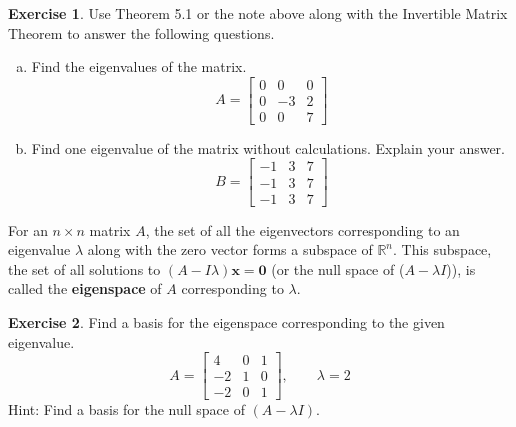\documentclass[10pt]{book}
\newcommand{\boxcolor}{gray!30}
\newenvironment{boxme}{\begin{mdframed}[backgroundcolor=\boxcolor,linewidth=0pt,nobreak=true]}{\end{mdframed}}
\theoremstyle{definition}
\newtheorem{exercise}{Exercise}[section]
\newcommand{\R}{\mathbb{R}}
\newcommand{\vect}[1]{\ensuremath{\boldsymbol{\mathbf{#1}}}}
\begin{document}
\begin{exercise} %
	Use Theorem 5.1 or the note above along with the Invertible Matrix Theorem to answer the following questions.
	\begin{multicols}{2}
		\begin{enumerate}[(a)]
			\item Find the eigenvalues of the matrix.
			$$A=\begin{bmatrix}0&0&0\\0&-3&2\\0&0&7\end{bmatrix}$$
			\columnbreak 
			\item Find one eigenvalue of the matrix without calculations. Explain your answer.
			$$B=\begin{bmatrix}-1&3&7\\-1&3&7\\-1&3&7\end{bmatrix}$$
		\end{enumerate}
	\end{multicols}
\end{exercise}
\vfill


\begin{boxme}
	For an $n\times n$ matrix $A$, the set of all the eigenvectors corresponding to an eigenvalue $\lambda$ along with the zero vector forms a subspace of $\R^n$. This subspace, the set of all solutions to $(A-I\lambda)\vect{x}=\vect{0}$ (or the null space of ($A-\lambda I$)), is called the \textbf{eigenspace} of $A$ corresponding to $\lambda$.
\end{boxme}

\begin{exercise} %
	Find a basis for the eigenspace corresponding to the given eigenvalue.
	$$ A = \begin{bmatrix}4&0&1\\-2&1&0\\-2&0&1\end{bmatrix}, \qquad \lambda = 2 $$
	Hint: Find a basis for the null space of $(A-\lambda I)$.
\end{exercise}
\vfill

\end{document}
